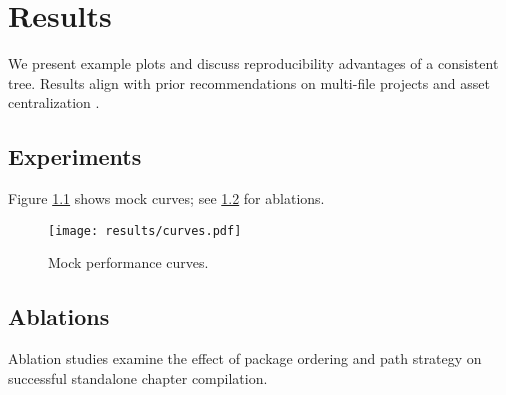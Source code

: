 \documentclass[../../main.tex]{subfiles}
\begin{document}
\chapter{Results}
We present example plots and discuss reproducibility advantages of a consistent tree. Results align with prior recommendations on multi-file projects and asset centralization \parencite{overleafMultiFile}. 

\section{Experiments}
Figure \ref{fig:results-curves} shows mock curves; see \cref{sec:ablations} for ablations.

\begin{figure}[ht]
  \centering
  \texttt{[image: results/curves.pdf]}
  \caption{Mock performance curves.}
  \label{fig:results-curves}
\end{figure}

\section{Ablations}
\label{sec:ablations}
Ablation studies examine the effect of package ordering and path strategy on successful standalone chapter compilation.
\end{document}
